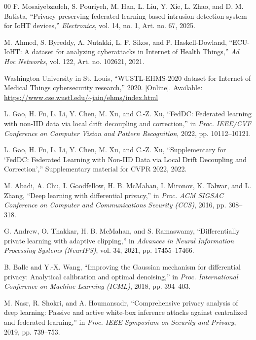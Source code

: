 \documentclass[conference]{IEEEtran}
\begin{document}
\begin{thebibliography}{00}
F. Mosaiyebzadeh, S. Pouriyeh, M. Han, L. Liu, Y. Xie, L. Zhao, and D. M.
Batista, ``Privacy-preserving federated learning-based intrusion detection
system for IoHT devices,'' \textit{Electronics}, vol. 14, no. 1, Art. no. 67,
2025.

M. Ahmed, S. Byreddy, A. Nutakki, L. F. Sikos, and P. Haskell-Dowland,
``ECU-IoHT: A dataset for analyzing cyberattacks in Internet of Health Things,''
\textit{Ad Hoc Networks}, vol. 122, Art. no. 102621, 2021.

Washington University in St. Louis, ``WUSTL-EHMS-2020 dataset for Internet of
Medical Things cybersecurity research,'' 2020. [Online]. Available:
\url{https://www.cse.wustl.edu/~jain/ehms/index.html}

L. Gao, H. Fu, L. Li, Y. Chen, M. Xu, and C.-Z. Xu, ``FedDC: Federated learning
with non-IID data via local drift decoupling and correction,'' in \textit{Proc.
IEEE/CVF Conference on Computer Vision and Pattern Recognition}, 2022, pp.
10112--10121.

L. Gao, H. Fu, L. Li, Y. Chen, M. Xu, and C.-Z. Xu, ``Supplementary for `FedDC:
Federated Learning with Non-IID Data via Local Drift Decoupling and
Correction','' Supplementary material for CVPR 2022, 2022.

M. Abadi, A. Chu, I. Goodfellow, H. B. McMahan, I. Mironov, K. Talwar, and L.
Zhang, ``Deep learning with differential privacy,'' in \textit{Proc. ACM SIGSAC
Conference on Computer and Communications Security (CCS)}, 2016, pp. 308--318.

G. Andrew, O. Thakkar, H. B. McMahan, and S. Ramaswamy, ``Differentially private
learning with adaptive clipping,'' in \textit{Advances in Neural Information
Processing Systems (NeurIPS)}, vol. 34, 2021, pp. 17455--17466.

B. Balle and Y.-X. Wang, ``Improving the Gaussian mechanism for differential
privacy: Analytical calibration and optimal denoising,'' in \textit{Proc.
International Conference on Machine Learning (ICML)}, 2018, pp. 394--403.

M. Nasr, R. Shokri, and A. Houmansadr, ``Comprehensive privacy analysis of deep
learning: Passive and active white-box inference attacks against centralized
and federated learning,'' in \textit{Proc. IEEE Symposium on Security and
Privacy}, 2019, pp. 739--753.


\end{thebibliography}
\end{document}
